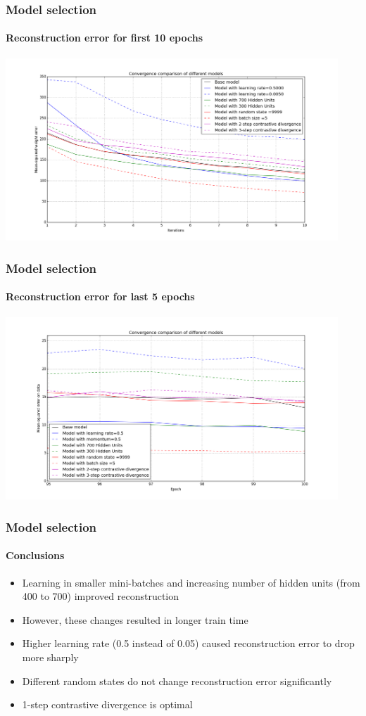\documentclass{beamer}
\begin{document}
  \begin{frame}
  \frametitle{Model selection}
  \framesubtitle{Reconstruction error for first 10 epochs}
    \includegraphics[width=12.5cm]{images/Plot_Convergence50train10epochs.png}
  \end{frame}
  \begin{frame}
  \frametitle{Model selection}
  \framesubtitle{Reconstruction error for last 5 epochs}
    \includegraphics[width=12.5cm]{images/Plot_Convergence50train95-100epochs.png}
  \end{frame}
  \begin{frame}
    \frametitle{Model selection}
    \framesubtitle{Conclusions}
    \begin{itemize}
	\item Learning in smaller mini-batches and increasing number of hidden units (from 400 to 700) improved reconstruction
	\item However, these changes resulted in longer train time 
	\item Higher learning rate (0.5 instead of 0.05) caused reconstruction error to drop more sharply 
	\item Different random states do not change reconstruction error significantly
	\item 1-step contrastive divergence is optimal
	\end{itemize}
  \end{frame}
\end{document}
